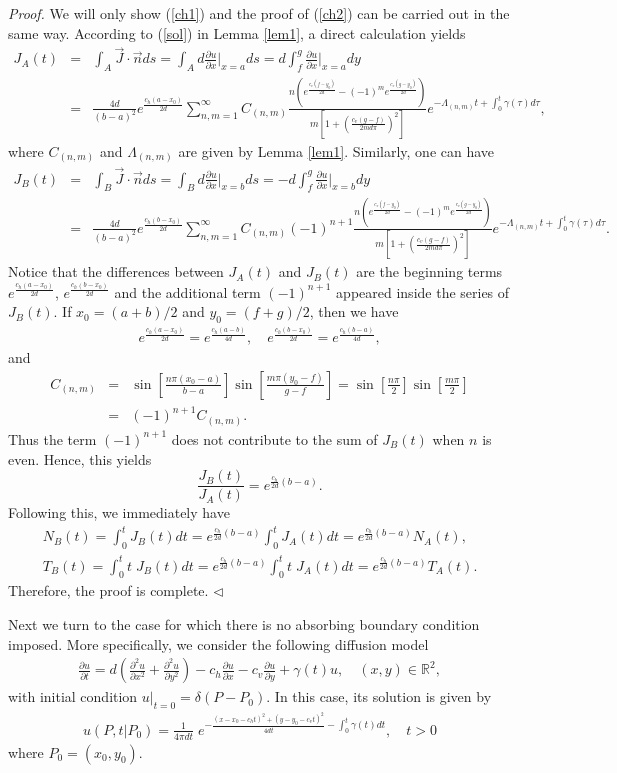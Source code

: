 \documentclass[11pt]{article}
\newenvironment{proof}{{\it Proof. }}{$\triangleleft$}
\newcommand{\bean}{\begin{eqnarray*}}
\newcommand{\eean}{\end{eqnarray*}}
\newcommand{\bea}{\begin{eqnarray}}
\newcommand{\eea}{\end{eqnarray}}
\newcommand{\Real}{\mathbb R}
\begin{document}
\begin{proof} We will only show (\ref{ch1}) and the proof of (\ref{ch2}) can be carried out in the same way. According to (\ref{sol}) in Lemma \ref{lem1}, a direct calculation yields
\bean
J_A(t)&=&\int_A\vec{J}\cdot\vec{n}ds=\int_Ad\frac{\partial u}{\partial x}\Big|_{x=a} ds=d\int_f^g\frac{\partial u}{\partial x}\Big|_{x=a}dy\\
&=& \frac{4d}{(b-a)^2} e^{\frac{c_h(a-x_0)}{2d}}\sum_{n, m=1}^{\infty}C_{(n, m)}\frac{n\left(e^{\frac{c_v(f-y_0)}{2d}}-(-1)^me^{\frac{c_v(g-y_0)}{2d}}\right)}{m\left[1+\left(\frac{c_v(g-f)}{2md\pi} \right)^2\right]}e^{-\Lambda_{(n, m)}t+\int_0^t\gamma(\tau)d\tau},
\eean
where $C_{(n, m)}$ and $\Lambda_{(n, m)}$ are given by Lemma \ref{lem1}. Similarly, one can have
\bean
J_B(t)&=&\int_B\vec{J}\cdot\vec{n}ds=\int_Bd\frac{\partial u}{\partial x}\Big|_{x=b} ds=-d\int_f^g\frac{\partial u}{\partial x}\Big|_{x=b}dy\\
&=& \frac{4d}{(b-a)^2} e^{\frac{c_h(b-x_0)}{2d}}\sum_{n, m=1}^{\infty}C_{(n, m)}(-1)^{n+1}\frac{n\left(e^{\frac{c_v(f-y_0)}{2d}}-(-1)^me^{\frac{c_v(g-y_0)}{2d}}\right)}{m\left[1+\left(\frac{c_v(g-f)}{2md\pi} \right)^2\right]}e^{-\Lambda_{(n, m)}t+\int_0^t\gamma(\tau)d\tau}.
\eean
Notice that the differences between $J_A(t)$ and $J_B(t)$ are the beginning terms $e^{\frac{c_h(a-x_0)}{2d}}$, $e^{\frac{c_h(b-x_0)}{2d}}$ and the additional term $(-1)^{n+1}$ appeared inside the series of $J_B(t)$. If $x_0=(a+b)/2$ and $y_0=(f+g)/2$, then we have
\bean
e^{\frac{c_h(a-x_0)}{2d}}=e^{\frac{c_h(a-b)}{4d}}, \quad e^{\frac{c_h(b-x_0)}{2d}}=e^{\frac{c_h(b-a)}{4d}},
\eean
and 
\bean
{C}_{(n, m)}&=&\sin\left[\frac{n\pi(x_0-a)}{b-a}\right]\sin\left[\frac{m\pi(y_0-f)}{g-f}\right]=\sin\left[\frac{n\pi}{2}\right]\sin\left[\frac{m\pi}{2}\right]\\
&=&(-1)^{n+1}{C}_{(n, m)}.
\eean
Thus the term $(-1)^{n+1}$ does not contribute to the sum of $J_B(t)$ when $n$ is even. Hence, this yields
\[\frac{J_B(t)}{J_A(t)}=e^{\frac{c_h}{2d}(b-a)}.\]
Following this, we immediately have
\bean
N_{B}(t)=\int_0^t J_{B}(t)dt=e^{\frac{c_h}{2d}(b-a)}\int_0^t J_{A}(t)dt=e^{\frac{c_h}{2d}(b-a)}N_A(t),\\
T_{B}(t)=\int_0^{t} t\;J_B(t)dt =e^{\frac{c_h}{2d}(b-a)}\int_0^{t} t\;J_A(t)dt=e^{\frac{c_h}{2d}(b-a)}T_A(t).
\eean
Therefore, the proof is complete.
\end{proof}


Next we turn to the case for which there is no absorbing boundary condition imposed. More specifically, we consider the following diffusion model
\bea\label{two-D-model}
\frac{\partial u}{\partial t}=d\left(\frac{\partial^2u}{\partial x^2}+\frac{\partial^2u}{\partial y^2}\right)-c_h\frac{\partial u}{\partial x}-c_v\frac{\partial u}{\partial y}+\gamma(t) u, \quad (x, y)\in \Real^2,
\eea
with initial condition $u|_{t=0}=\delta(P-P_0)$. In this case, its solution is given by
\bean
u(P, t|P_0)=\frac{1}{4\pi d t}\;e^{-\frac{(x-x_0-c_ht)^2+(y-y_0-c_vt)^2}{4dt}-\int_0^t\gamma(t)dt},\quad t>0
\eean
where $P_0=(x_0, y_0)$.
\end{document}
